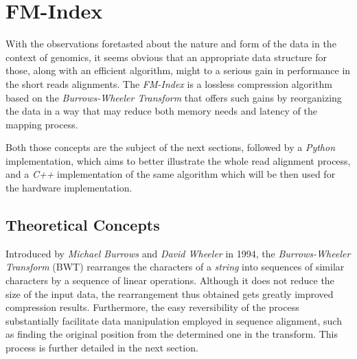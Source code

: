 
\chapter{FM-Index} %

\label{Chapter2} %



With the observations foretasted about the nature and form of the data in the context of genomics, it seems obvious that an appropriate data structure for those, along with an efficient algorithm, might to a serious gain in performance in the short reads alignments. The \textsl{FM-Index} is a lossless compression algorithm based on the \textsl{Burrows-Wheeler Transform} that offers such gains by reorganizing the data in a way that may reduce both memory needs and latency of the mapping process. 

Both those concepts are the subject of the next sections, followed by a \textsl{Python} implementation, which aims to better illustrate the whole read alignment process, and a \textsl{C++} implementation of the same algorithm which will be then used for the hardware implementation.

\section{Theoretical Concepts}

Introduced by \textsl{Michael Burrows} and \textsl{David Wheeler} in 1994, the \textsl{Burrows-Wheeler Transform} (BWT) rearranges the characters of a \textit{string} into sequences of similar characters by a sequence of linear operations. Although it does not reduce the size of the input data, the rearrangement thus obtained gets greatly improved compression results. Furthermore, the easy reversibility of the process substantially facilitate data manipulation employed in sequence alignment, such as finding the original position from the determined one in the transform. This process is further detailed in the next section.

